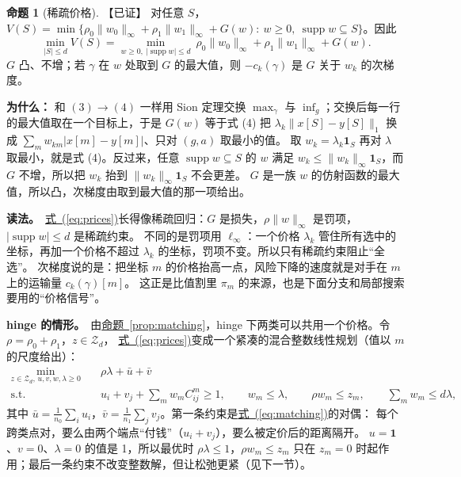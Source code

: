 \documentclass[11pt,a4paper,fontset=none]{ctexart}
\newcommand{\Eqref}[1]{\hyperref[#1]{式~(\ref*{#1})}}
\newcommand{\Nref}[2]{\hyperref[#2]{#1~\ref*{#2}}}
\theoremstyle{definition}
\newtheorem{proposition}{命题}
\newenvironment{why}{\par\noindent\textbf{为什么：}\ignorespaces}{\par}
\newcommand{\para}[1]{\par\smallskip\noindent\textbf{#1}\ }
\newcommand{\status}[1]{\textrm{【#1】}}
\begin{document}
\begin{proposition}[稀疏价格]\label{prop:prices}\status{已证}
对任意 $S$，$V(S)=\min\{\rho_0\|w_0\|_\infty+\rho_1\|w_1\|_\infty+G(w):\ w\ge0,\ \operatorname{supp}w\subseteq S\}$。因此
\begin{equation}\label{eq:prices}
\min_{|S|\le d}V(S)=\min_{w\ge0,\ |\operatorname{supp}w|\le d}\ \rho_0\|w_0\|_\infty+\rho_1\|w_1\|_\infty+G(w).
\end{equation}
$G$ 凸、不增；若 $\gamma$ 在 $w$ 处取到 $G$ 的最大值，则 $-c_k(\gamma)$ 是 $G$ 关于 $w_k$ 的次梯度。
\end{proposition}
\begin{why}
和 $(3)\to(4)$ 一样用 Sion 定理交换 $\max_\gamma$ 与 $\inf_g$；交换后每一行的最大值取在一个目标上，于是
$G(w)$ 等于式 (4) 把 $\lambda_k\|x[S]-y[S]\|_1$ 换成 $\sum_mw_{km}|x[m]-y[m]|$、只对 $(g,a)$ 取最小的值。
取 $w_k=\lambda_k\mathbf 1_S$ 再对 $\lambda$ 取最小，就是式 (4)。反过来，任意 $\operatorname{supp}w\subseteq S$ 的 $w$ 满足 $w_k\le\|w_k\|_\infty\mathbf 1_S$，而 $G$ 不增，所以把 $w_k$ 抬到 $\|w_k\|_\infty\mathbf 1_S$ 不会更差。
$G$ 是一族 $w$ 的仿射函数的最大值，所以凸，次梯度由取到最大值的那一项给出。
\end{why}

\para{读法。}\Eqref{eq:prices}长得像稀疏回归：$G$ 是损失，$\rho\|w\|_\infty$ 是罚项，$|\operatorname{supp}w|\le d$ 是稀疏约束。
不同的是罚项用 $\ell_\infty$：一个价格 $\lambda_k$ 管住所有选中的坐标，再加一个价格不超过 $\lambda_k$ 的坐标，罚项不变。所以只有稀疏约束阻止“全选”。
次梯度说的是：把坐标 $m$ 的价格抬高一点，风险下降的速度就是对手在 $m$ 上的运输量 $c_k(\gamma)[m]$。
这正是比值割里 $\pi_m$ 的来源，也是下面分支和局部搜索要用的“价格信号”。

\para{hinge 的情形。}由\Nref{命题}{prop:matching}，hinge 下两类可以共用一个价格。令 $\rho=\rho_0+\rho_1$，$z\in\mathcal Z_d$，
\Eqref{eq:prices}变成一个紧凑的混合整数线性规划（值以 $m$ 的尺度给出）：
\begin{equation}\label{eq:milp}
\begin{aligned}
\min_{z\in\mathcal Z_d,\,u,v,w,\lambda\ge0}\quad&\rho\lambda+\bar u+\bar v\\
\text{s.t.}\quad&u_i+v_j+\sum_m w_mC^m_{ij}\ge1,\qquad w_m\le\lambda,\qquad \rho w_m\le z_m,\qquad \sum_m w_m\le d\lambda,
\end{aligned}
\end{equation}
其中 $\bar u=\frac1{n_0}\sum_iu_i$，$\bar v=\frac1{n_1}\sum_jv_j$。第一条约束是\Eqref{eq:matching}的对偶：
每个跨类点对，要么由两个端点“付钱”（$u_i+v_j$），要么被定价后的距离隔开。
$u=\mathbf 1$、$v=0$、$\lambda=0$ 的值是 1，所以最优时 $\rho\lambda\le1$，$\rho w_m\le z_m$ 只在 $z_m=0$ 时起作用；最后一条约束不改变整数解，但让松弛更紧（见下一节）。
\end{document}
